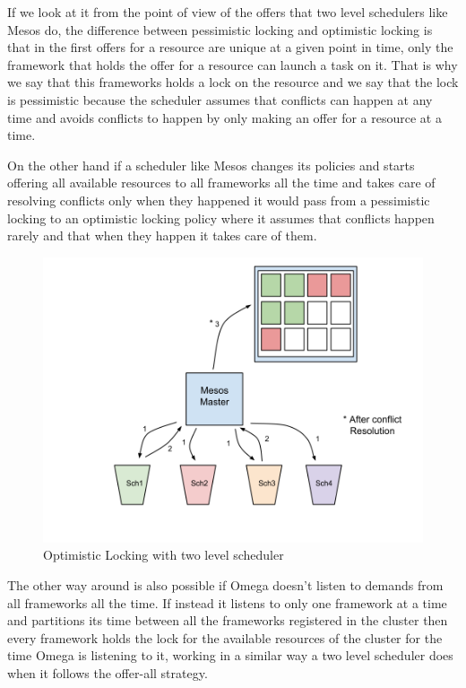 \documentclass{report}                     %
\begin{document}
If we look at it from the point of view of the offers that two level
schedulers like Mesos do, the difference between pessimistic locking
and optimistic locking is that in the first offers for a resource are
unique at a given point in time, only the framework that holds the
offer for a resource can launch a task on it. That is why we say that
this frameworks holds a lock on the resource and we say that the lock
is pessimistic because the scheduler assumes that conflicts can happen
at any time and avoids conflicts to happen by only making an offer for
a resource at a time.

On the other hand if a scheduler like Mesos changes its policies and
starts offering all available resources to all frameworks all the time
and takes care of resolving conflicts only when they happened it would
pass from a pessimistic locking to an optimistic locking policy where
it assumes that conflicts happen rarely and that when they happen it
takes care of them.

\begin{figure}[!ht]
  \centering
  \includegraphics[scale=0.25,natwidth=960,natheight=720]{MesosOptimisticLocking.png}
  \caption{Optimistic Locking with two level scheduler}
  \label{fig:centralized}
\end{figure}

The other way around is also possible if Omega doesn't listen to
demands from all frameworks all the time. If instead it listens to only
one framework at a time and partitions its time between all the
frameworks registered in the cluster then every framework holds the
lock for the available resources of the cluster for the time Omega is
listening to it, working in a similar way a two level scheduler does
when it follows the offer-all strategy.
\end{document}
